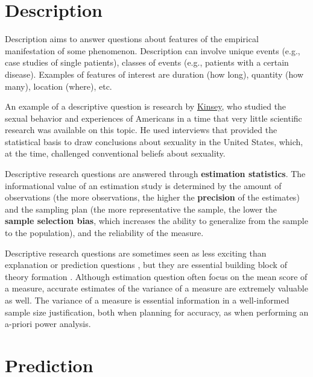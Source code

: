 \documentclass[
]{krantz}
\begin{document}
\hypertarget{description}{%
\section{Description}\label{description}}

Description aims to answer questions about features of the empirical manifestation of some phenomenon. Description can involve unique events (e.g., case studies of single patients), classes of events (e.g., patients with a certain disease). Examples of features of interest are duration (how long), quantity (how many), location (where), etc.

An example of a descriptive question is research by \href{https://en.wikipedia.org/wiki/Kinsey_Reports}{Kinsey}, who studied the sexual behavior and experiences of Americans in a time that very little scientific research was available on this topic. He used interviews that provided the statistical basis to draw conclusions about sexuality in the United States, which, at the time, challenged conventional beliefs about sexuality.

Descriptive research questions are answered through \textbf{estimation statistics}. The informational value of an estimation study is determined by the amount of observations (the more observations, the higher the \textbf{precision} of the estimates) and the sampling plan (the more representative the sample, the lower the \textbf{sample selection bias}, which increases the ability to generalize from the sample to the population), and the reliability of the measure.

Descriptive research questions are sometimes seen as less exciting than explanation or prediction questions \citep{gerring_mere_2012}, but they are essential building block of theory formation \citep{scheel_why_2021}. Although estimation question often focus on the mean score of a measure, accurate estimates of the variance of a measure are extremely valuable as well. The variance of a measure is essential information in a well-informed sample size justification, both when planning for accuracy, as when performing an a-priori power analysis.

\hypertarget{prediction}{%
\section{Prediction}\label{prediction}}
\end{document}
